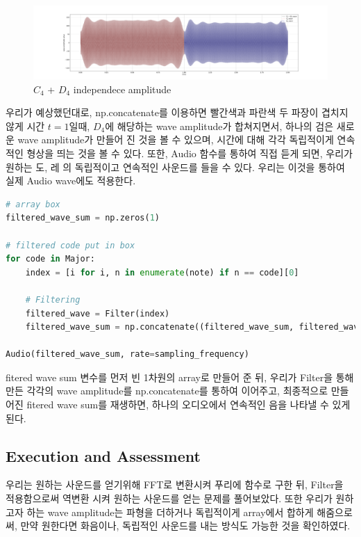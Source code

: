 \documentclass[11pt]{article}
\begin{document}
\begin{figure}[!ht]
  \centering
  \includegraphics[width=1\textwidth]{wave_amp_independence.pdf}
  \caption{$C_{4}$ + $D_{4}$ independece amplitude}
\end{figure}


우리가 예상했던대로, np.concatenate를 이용하면 빨간색과 파란색 두 파장이 겹치지 않게 시간 $t = 1$일때, $D_4$에 해당하는 wave amplitude가 합쳐지면서, 하나의 검은 새로운 wave amplitude가 만들어 진 것을 볼 수 있으며, 시간에 대해 각각 독립적이게 연속적인 형상을 띄는 것을 볼 수 있다. 또한, Audio 함수를 통하여 직접 듣게 되면, 우리가 원하는 도, 레 의 독립적이고 연속적인 사운드를 들을 수 있다. 우리는 이것을 통하여 실제 Audio wave에도 적용한다.

\begin{lstlisting}[language=Python]
# array box
filtered_wave_sum = np.zeros(1)

# filtered code put in box
for code in Major:
    index = [i for i, n in enumerate(note) if n == code][0]

    # Filtering 
    filtered_wave = Filter(index)
    filtered_wave_sum = np.concatenate((filtered_wave_sum, filtered_wave), axis = 0)

Audio(filtered_wave_sum, rate=sampling_frequency)
\end{lstlisting}
fitered wave sum 변수를 먼저 빈 1차원의 array로 만들어 준 뒤, 우리가 Filter을 통해 만든 각각의 wave amplitude를 np.concatenate를 통하여 이어주고, 최종적으로 만들어진 fitered wave sum를 재생하면, 하나의 오디오에서 연속적인 음을 나타낼 수 있게 된다. 

\subsection{Execution and Assessment}
우리는 원하는 사운드를 얻기위해 FFT로 변환시켜 푸리에 함수로 구한 뒤, Filter을 적용함으로써 역변환 시켜 원하는 사운드를 얻는 문제를 풀어보았다. 또한 우리가 원하고자 하는 wave amplitude는 파형을 더하거나 독립적이게 array에서 합하게 해줌으로써, 만약 원한다면 화음이나, 독립적인 사운드를 내는 방식도 가능한 것을 확인하였다.
\end{document}
